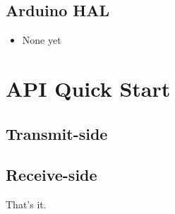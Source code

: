 \documentclass[11pt]{article}
\begin{document}
\subsection{Arduino HAL}
\begin{itemize}
  \item None yet
\end{itemize}

\section{API Quick Start}
\subsection{Transmit-side}

\subsection{Receive-side}

That's it.
\end{document}
